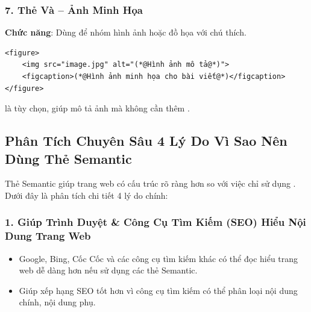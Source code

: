 \subsubsection{7. Thẻ  Và  -- Ảnh Minh Họa}
\textbf{Chức năng}: Dùng để nhóm hình ảnh hoặc đồ họa với chú thích.


\begin{codeWindow}
\begin{lstlisting}[language=HTML5]
<figure>
    <img src="image.jpg" alt="(*@Hình ảnh mô tả@*)">
    <figcaption>(*@Hình ảnh minh họa cho bài viết@*)</figcaption>
</figure>
\end{lstlisting}
\end{codeWindow}

\begin{noteBox}
 là tùy chọn, giúp mô tả ảnh mà không cần thêm .
\end{noteBox}

\subsection{Phân Tích Chuyên Sâu 4 Lý Do Vì Sao Nên Dùng Thẻ Semantic}

Thẻ Semantic giúp trang web có cấu trúc rõ ràng hơn so với việc chỉ sử dụng . Dưới đây là phân tích chi tiết 4 lý do chính:

\subsubsection{1. Giúp Trình Duyệt \& Công Cụ Tìm Kiếm (SEO) Hiểu Nội Dung Trang Web}
\begin{itemize}[leftmargin=1.8em, itemsep=3pt, parsep=0pt]
    \item Google, Bing, Cốc Cốc và các công cụ tìm kiếm khác có thể đọc hiểu trang web dễ dàng hơn nếu sử dụng các thẻ Semantic.
    \item Giúp xếp hạng SEO tốt hơn vì công cụ tìm kiếm có thể phân loại nội dung chính, nội dung phụ.
\end{itemize}

